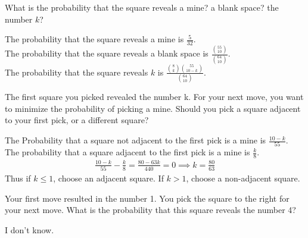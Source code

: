\documentclass[11pt]{article}
\begin{document}
\begin{Parts}
    
    \Part What is the probability that the square reveals a mine? a blank space? the number $k$? 
    \begin{Answer}
        The probability that the square reveals a mine is $\frac{5}{32}$. \\
        The probability that the square reveals a blank space is $\frac{{55 \choose 10}}{{64 \choose 10}}$. \\
        The probability that the square reveals $k$ is $\frac{{8 \choose k}{55 \choose 10-k}}{{64 \choose 10}}$.
    \end{Answer}

    \Part The first square you picked revealed the number k. For your next move, you want to minimize the probability of 
          picking a mine. Should you pick a square adjacent to your first pick, or a different square?
    \begin{Answer}
        The Probability that a square not adjacent to the first pick is a mine is $\frac{10 - k}{55}$. The probability that 
        a square adjacent to the first pick is a mine is $\frac{k}{8}$. 
        \begin{align*}
            \frac{10-k}{55} - \frac{k}{8} = \frac{80-63k}{440} = 0 \implies k = \frac{80}{63} 
        \end{align*}
        Thus if $k \leq 1$, choose an adjacent square. If $k > 1$, choose a non-adjacent square. 
    \end{Answer}

    \Part Your first move resulted in the number 1. You pick the square to the right for your next move. What is the 
          probability that this square reveals the number 4?
    \begin{Answer}
        I don't know. 
    \end{Answer}
\end{Parts}
\end{document}
